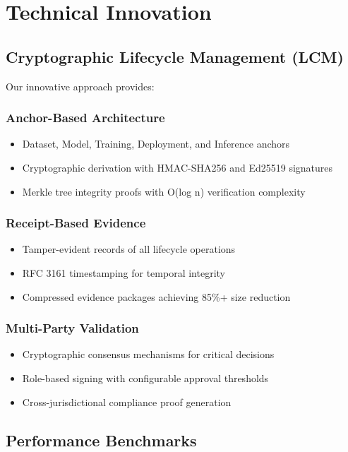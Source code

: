 \documentclass[12pt,a4paper]{article}
\begin{document}
\section{Technical Innovation}

\subsection{Cryptographic Lifecycle Management (LCM)}

Our innovative approach provides:

\subsubsection{Anchor-Based Architecture}
\begin{itemize}
    \item Dataset, Model, Training, Deployment, and Inference anchors
    \item Cryptographic derivation with HMAC-SHA256 and Ed25519 signatures
    \item Merkle tree integrity proofs with O(log n) verification complexity
\end{itemize}

\subsubsection{Receipt-Based Evidence}
\begin{itemize}
    \item Tamper-evident records of all lifecycle operations
    \item RFC 3161 timestamping for temporal integrity
    \item Compressed evidence packages achieving 85\%+ size reduction
\end{itemize}

\subsubsection{Multi-Party Validation}
\begin{itemize}
    \item Cryptographic consensus mechanisms for critical decisions
    \item Role-based signing with configurable approval thresholds
    \item Cross-jurisdictional compliance proof generation
\end{itemize}

\subsection{Performance Benchmarks}
\end{document}
